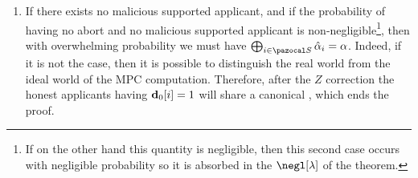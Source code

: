 \begin{proofE}
\begin{enumerate}
    \item If there exists no malicious supported applicant, and if the probability of having no abort and no malicious supported applicant is non-negligible\footnote{If on the other hand this quantity is negligible, then this second case occurs with negligible probability so it is absorbed in the $\negl[\lambda]$ of the theorem.}, then with overwhelming probability we must have $\bigoplus_{i \in \cS}\hat{\alpha}_i = \alpha$. Indeed, if it is not the case, then it is possible to distinguish the real world from the ideal world of the MPC computation. Therefore, after the $Z$ correction the honest applicants having $\mathbf{d}_0[i]=1$ will share a canonical \GHZ{}, which ends the proof.
  \end{enumerate}
\end{proofE}

